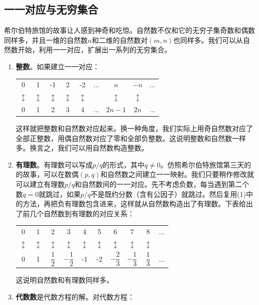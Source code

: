\documentclass[b5paper]{ctexart}
\begin{document}
\subsection{一一对应与无穷集合}

希尔伯特旅馆的故事让人感到神奇和吃惊。自然数不仅和它的无穷子集奇数和偶数同样多，并且一维的自然数$n$和二维的自然数对$(m, n)$也同样多。我们可以从自然数开始，利用一一对应，扩展出一系列的无穷集合。

\begin{enumerate}[(1)]
\item \textbf{整数}。如果建立一一对应：

\begin{tabular}{ccccccccc}
0 & 1 & -1 & 2 & -2 & ... & $n$ & $-n$ & ... \\
$\updownarrow$ & $\updownarrow$ & $\updownarrow$ & $\updownarrow$ & $\updownarrow$ & & $\updownarrow$ & $\updownarrow$ & \\
0 & 1 &  2 & 3 &  4 & ... & $2n - 1$ & $2n$ & ... \\
\end{tabular}

这样就把整数和自然数对应起来。换一种角度，我们实际上用奇自然数对应了全部正整数，用偶自然数对应了零和全部负整数。这说明整数和自然数一样多。换言之，我们可以用自然数构造整数。

\item \textbf{有理数}。有理数可以写成$p/q$的形式，其中$q \ne 0$。仿照希尔伯特旅馆第三天的的故事，可以在数偶$(p, q)$和自然数之间建立一一映射。我们只要稍作修改就可以建立有理数$p/q$和自然数间的一一对应。先不考虑负数，每当遇到第二个数$q = 0$就跳过，如果$p/q$不是既约分数（含有公因子）就跳过。然后复用(1)中的方法，再把负有理数包含进来，这样就从自然数构造出了有理数。下表给出了前几个自然数到有理数的对应关系：

\begin{tabular}{cccccccccc}
0 & 1 & 2 & 3 & 4 & 5 & 6 & 7 & 8 & ... \\
$\updownarrow$ & $\updownarrow$ & $\updownarrow$ & $\updownarrow$ & $\updownarrow$ & $\updownarrow$ & $\updownarrow$ & $\updownarrow$ & $\updownarrow$ & \\
0 & 1 & $\dfrac{1}{2}$ & $-\dfrac{1}{2}$ & -1 & -2 & $-\dfrac{2}{3}$ & $-\dfrac{1}{3}$ & $\dfrac{1}{3}$ & ... \\
\end{tabular}

这说明自然数和有理数同样多。

\item \textbf{代数数}是代数方程的解。对代数方程：


\end{enumerate}
\end{document}

